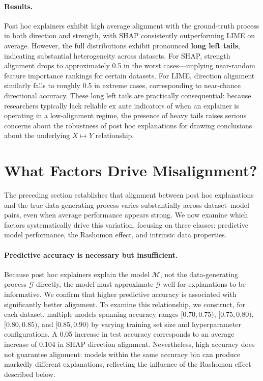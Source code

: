 \documentclass[11pt]{article}
\begin{document}
\paragraph{Results.}
Post hoc explainers exhibit high average alignment with the ground-truth process in both direction and strength, with SHAP consistently outperforming LIME on average. However, the full distributions exhibit pronounced \textbf{long left tails}, indicating substantial heterogeneity across datasets. For SHAP, strength alignment drops to approximately 0.5 in the worst cases---implying near-random feature importance rankings for certain datasets. For LIME, direction alignment similarly falls to roughly 0.5 in extreme cases, corresponding to near-chance directional accuracy. These long left tails are practically consequential: because researchers typically lack reliable ex ante indicators of when an explainer is operating in a low-alignment regime, the presence of heavy tails raises serious concerns about the robustness of post hoc explanations for drawing conclusions about the underlying $X \mapsto Y$ relationship.

\vspace{-0.1cm}
\section{What Factors Drive Misalignment?}
\vspace{-0.1cm}

The preceding section establishes that alignment between post hoc explanations and the true data-generating process varies substantially across dataset--model pairs, even when average performance appears strong. We now examine which factors systematically drive this variation, focusing on three classes: predictive model performance, the Rashomon effect, and intrinsic data properties.
\vspace{-0.5cm}
\paragraph{Predictive accuracy is necessary but insufficient.}
Because post hoc explainers explain the model $\mathcal{M}$, not the data-generating process $\mathcal{G}$ directly, the model must approximate $\mathcal{G}$ well for explanations to be informative. We confirm that higher predictive accuracy is associated with significantly better alignment. To examine this relationship, we construct, for each dataset, multiple models spanning accuracy ranges $[0.70, 0.75)$, $[0.75, 0.80)$, $[0.80, 0.85)$, and $[0.85, 0.90)$ by varying training set size and hyperparameter configurations. A 0.05 increase in test accuracy corresponds to an average increase of 0.104 in SHAP direction alignment. Nevertheless, high accuracy does not guarantee alignment: models within the same accuracy bin can produce markedly different explanations, reflecting the influence of the Rashomon effect described below.
\vspace{-0.5cm}
\end{document}
